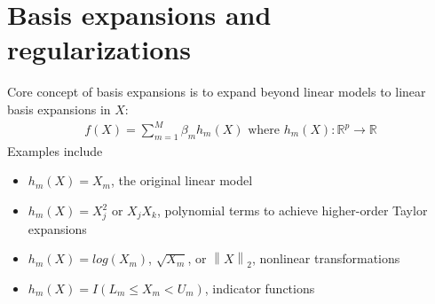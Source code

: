 \documentclass{article}
\newcommand{\norm}[2]{\left\lVert#1\right\rVert_#2}
\begin{document}
\section{Basis expansions and regularizations}
Core concept of basis expansions is to expand beyond linear models to linear basis expansions in $X$:
\begin{align*}
  f(X) = \sum_{m=1}^M\beta_mh_m(X) \textrm{ where }h_m(X): \mathbb{R}^p \rightarrow \mathbb{R}
\end{align*}
Examples include
\begin{itemize}
  \item $h_m(X) = X_m$, the original linear model
  \item $h_m(X) = X_j^2$ or $X_jX_k$, polynomial terms to achieve higher-order Taylor expansions
  \item $h_m(X) = log(X_m)$, $\sqrt{X_m}$, or $\norm{X}{2}$, nonlinear transformations
  \item $h_m(X) = I(L_m \leq X_m < U_m)$, indicator functions
\end{itemize}
\end{document}
